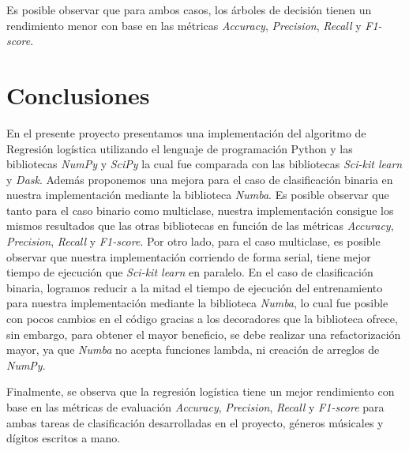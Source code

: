 \documentclass[runningheads]{llncs}
\begin{document}
Es posible observar que para ambos casos, los árboles de decisión tienen un rendimiento menor con base en las métricas \textit{Accuracy}, \textit{Precision}, \textit{Recall} y \textit{F1-score}.
\section{Conclusiones}
En el presente proyecto presentamos una implementación del algoritmo de Regresión logística utilizando el lenguaje de programación Python y las bibliotecas \textit{NumPy} y \textit{SciPy} la cual fue comparada con las bibliotecas \textit{Sci-kit learn} y \textit{Dask}. Además proponemos una mejora para el caso de clasificación binaria en nuestra implementación mediante la biblioteca \textit{Numba}. Es posible observar que tanto para el caso binario como multiclase, nuestra implementación consigue los mismos resultados que las otras bibliotecas en función de las métricas \textit{Accuracy}, \textit{Precision}, \textit{Recall} y \textit{F1-score}. Por otro lado, para el caso multiclase, es posible observar que nuestra implementación corriendo de forma serial, tiene mejor tiempo de ejecución que \textit{Sci-kit learn} en paralelo. En el caso de clasificación binaria, logramos reducir a la mitad el tiempo de ejecución del entrenamiento para nuestra implementación mediante la biblioteca \textit{Numba}, lo cual fue posible con pocos cambios en el código gracias a los decoradores que la biblioteca ofrece, sin embargo, para obtener el mayor beneficio, se debe realizar una refactorización mayor, ya que \textit{Numba} no acepta funciones lambda, ni creación de arreglos de \textit{NumPy}.

Finalmente, se observa que la regresión logística tiene un mejor rendimiento con base en las métricas de evaluación \textit{Accuracy}, \textit{Precision}, \textit{Recall} y \textit{F1-score} para ambas tareas de clasificación desarrolladas en el proyecto, géneros músicales y dígitos escritos a mano.


\end{document}
